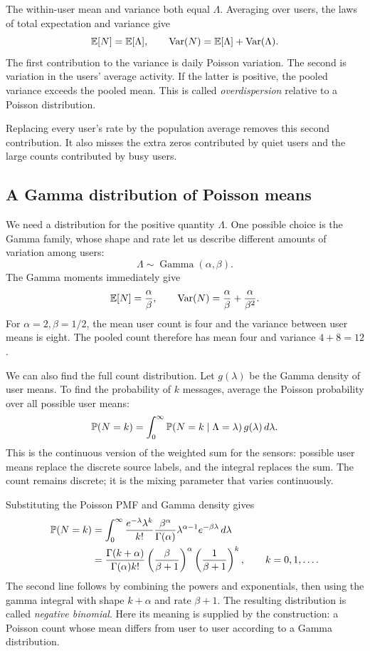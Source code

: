 The within-user mean and variance both equal \(\Lambda\). Averaging over
users, the laws of total expectation and variance give
\[
  \mathbb{E}[N]=\mathbb{E}[\Lambda],\qquad
  \operatorname{Var}(N)=\mathbb{E}[\Lambda]+\operatorname{Var}(\Lambda).
\]
The first contribution to the variance is daily Poisson variation.
The second is variation in the users' average activity.
If the latter is positive, the pooled variance exceeds the pooled mean.
This is called \emph{overdispersion} relative to a Poisson distribution.

Replacing every user's rate by the population average removes this
second contribution. It also misses the extra zeros contributed by
quiet users and the large counts contributed by busy users.

\subsection{A Gamma distribution of Poisson means}

We need a distribution for the positive quantity \(\Lambda\).
One possible choice is the Gamma family, whose shape and rate let us
describe different amounts of variation among users:
\[
  \Lambda\sim\operatorname{Gamma}(\alpha,\beta).
\]
The Gamma moments immediately give
\[
  \mathbb{E}[N]=\frac{\alpha}{\beta},\qquad
  \operatorname{Var}(N)=\frac{\alpha}{\beta}+\frac{\alpha}{\beta^2}.
\]
For \(\alpha=2,\beta=1/2\), the mean user count is four and
the variance between user means is eight. The pooled count therefore
has mean four and variance \(4+8=12\).

We can also find the full count distribution. Let \(g(\lambda)\) be the
Gamma density of user means. To find the probability of \(k\) messages,
average the Poisson probability over all possible user means:
\[
  \mathbb{P}(N=k)=\int_0^\infty
       \mathbb{P}(N=k\mid\Lambda=\lambda)\,g(\lambda)\,d\lambda.
\]
This is the continuous version of the weighted sum for the sensors:
possible user means replace the discrete source labels, and the integral
replaces the sum. The count remains discrete; it is the mixing parameter
that varies continuously.

Substituting the Poisson PMF and Gamma density gives
\begin{align*}
  \mathbb{P}(N=k)
  &=\int_0^\infty
     \frac{e^{-\lambda}\lambda^k}{k!}
     \frac{\beta^\alpha}{\Gamma(\alpha)}
       \lambda^{\alpha-1}e^{-\beta\lambda}\,d\lambda\\
  &=\frac{\Gamma(k+\alpha)}{\Gamma(\alpha)k!}
      \left(\frac{\beta}{\beta+1}\right)^\alpha
      \left(\frac1{\beta+1}\right)^k,\qquad k=0,1,\ldots.
\end{align*}
The second line follows by combining the powers and exponentials,
then using the gamma integral with shape \(k+\alpha\) and rate
\(\beta+1\). The resulting distribution is called \emph{negative binomial}.
Here its meaning is supplied by the construction: a Poisson count whose
mean differs from user to user according to a Gamma distribution.

